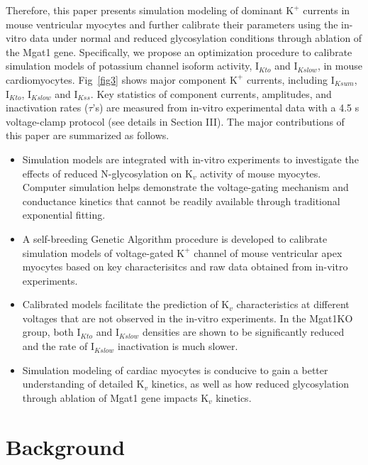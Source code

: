 \documentclass[10pt,letterpaper]{article}
\begin{document}
Therefore, this paper presents simulation modeling of dominant $\text{K}^{+}$ currents in mouse ventricular myocytes and further calibrate their parameters using the in-vitro data under normal and reduced glycosylation conditions through ablation of the Mgat1 gene. Specifically, we propose an optimization procedure to calibrate simulation models of potassium channel isoform activity, $\text{I}_{Kto}$ and $\text{I}_{Kslow}$, in mouse cardiomyocytes.  Fig~\ref{fig3} shows  major component $\text{K}^{+}$ currents, including $\text{I}_{Ksum}$, $\text{I}_{Kto}$, $\text{I}_{Kslow}$ and $\text{I}_{Kss}$. Key statistics of component currents, amplitudes, and inactivation rates ($\tau$'s) are measured from in-vitro experimental data with a 4.5 s voltage-clamp protocol (see details in Section III). The major contributions of this paper are summarized as follows.
\begin{itemize}
    \item Simulation models are integrated with in-vitro experiments to investigate the effects of reduced N-glycosylation on $\text{K}_{v}$ activity of mouse myocytes. Computer simulation helps demonstrate the voltage-gating mechanism and conductance kinetics that cannot be readily available through traditional exponential fitting. 
    \item A self-breeding Genetic Algorithm procedure is developed to calibrate simulation models of voltage-gated $\text{K}^{+}$ channel of mouse ventricular apex myocytes based on key characterisitcs and raw data obtained from in-vitro experiments.
    \item Calibrated models facilitate the prediction of $\text{K}_{v}$ characteristics at different voltages that are not observed in the in-vitro experiments. In the Mgat1KO group, both $\text{I}_{Kto}$ and $\text{I}_{Kslow}$ densities are shown to be significantly reduced and the rate of $\text{I}_{Kslow}$ inactivation is much slower.
    \item Simulation modeling of cardiac myocytes is conducive to gain a better understanding of detailed $\text{K}_{v}$ kinetics, as well as how reduced glycosylation through ablation of Mgat1 gene impacts $\text{K}_{v}$ kinetics.
\end{itemize}

\section*{Background}
\end{document}
